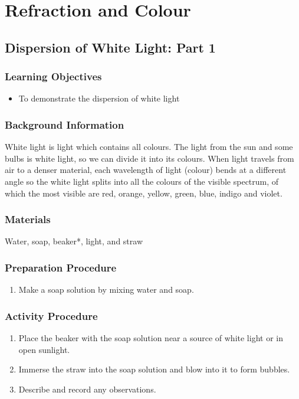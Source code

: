 \section{Refraction and Colour}

\subsection{Dispersion of White Light: Part 1}

\subsubsection*{Learning Objectives}
\begin{itemize}
\item{To demonstrate the dispersion of white light} 
\end{itemize}

\subsubsection*{Background Information}
White light is light which contains all colours.  The light from the sun and some bulbs is white light, so we can divide it into its colours.  When light travels from air to a denser material, each wavelength of light (colour) bends at a different angle so the white light splits into all the colours of the visible spectrum, of which the most visible are red, orange, yellow, green, blue, indigo and violet.  

\subsubsection*{Materials}
Water, soap, beaker*, light, and straw

\subsubsection*{Preparation Procedure}
\begin{enumerate}
\item{Make a soap solution by mixing water and soap.} 
\end{enumerate}

\subsubsection*{Activity Procedure}
\begin{enumerate}
\item{Place the beaker with the soap solution near a source of white light or in open sunlight.} 
\item{Immerse the straw into the soap solution and blow into it to form bubbles.} 
\item{Describe and record any observations.} 
\end{enumerate}

